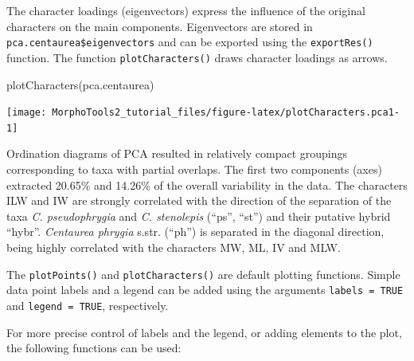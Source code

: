 \documentclass[
  11pt,
  a4paper]{article}
\newenvironment{Shaded}{\begin{snugshade}}{\end{snugshade}}
\newcommand{\AttributeTok}[1]{\textcolor[rgb]{0.77,0.63,0.00}{#1}}
\newcommand{\FunctionTok}[1]{\textcolor[rgb]{0.00,0.00,0.00}{#1}}
\newcommand{\NormalTok}[1]{#1}
\newcommand{\SpecialCharTok}[1]{\textcolor[rgb]{0.00,0.00,0.00}{#1}}
\newcommand{\StringTok}[1]{\textcolor[rgb]{0.31,0.60,0.02}{#1}}
\begin{document}
The character loadings (eigenvectors) express the influence of the
original characters on the main components. Eigenvectors are stored in
\texttt{pca.centaurea\$eigenvectors} and can be exported using the
\texttt{exportRes()} function. The function \texttt{plotCharacters()}
draws character loadings as arrows.

\begin{Shaded}
\begin{Highlighting}[]
\FunctionTok{plotCharacters}\NormalTok{(pca.centaurea)}
\end{Highlighting}
\end{Shaded}

\begin{center}\texttt{[image: MorphoTools2\_tutorial\_files/figure-latex/plotCharacters.pca1-1]} \end{center}

\begin{Shaded}
\end{Shaded}

Ordination diagrams of PCA resulted in relatively compact groupings
corresponding to taxa with partial overlaps. The first two components
(axes) extracted 20.65\% and 14.26\% of the overall variability in the
data. The characters ILW and IW are strongly correlated with the
direction of the separation of the taxa \emph{C. pseudophrygia} and
\emph{C. stenolepis} (``ps'', ``st'') and their putative hybrid
``hybr''. \emph{Centaurea phrygia} s.str. (``ph'') is separated in the
diagonal direction, being highly correlated with the characters MW, ML,
IV and MLW.

The \texttt{plotPoints()} and \texttt{plotCharacters()} are default
plotting functions. Simple data point labels and a legend can be added
using the arguments \texttt{labels\ =\ TRUE} and
\texttt{legend\ =\ TRUE}, respectively.

For more precise control of labels and the legend, or adding elements to
the plot, the following functions can be used: \vspace{-0.3cm}
\end{document}
